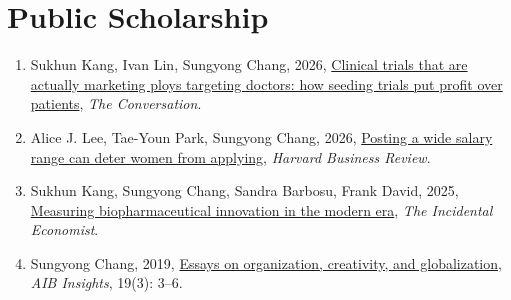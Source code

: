 \documentclass[11pt]{article}
\newenvironment{pubs}
  {\begin{enumerate}[label={(\arabic*)},leftmargin=1.9em,labelsep=0.5em,
     align=left,itemsep=5pt,topsep=3pt]}
  {\end{enumerate}}
\begin{document}
\section{Public Scholarship}
\begin{pubs}
\item Sukhun Kang, Ivan Lin, Sungyong Chang, 2026, \href{https://theconversation.com/clinical-trials-that-are-actually-marketing-ploys-targeting-doctors-how-seeding-trials-put-profit-over-patients-280398}{Clinical trials that are actually marketing ploys targeting doctors: how seeding trials put profit over patients}, \textit{The Conversation}.
\item Alice J. Lee, Tae-Youn Park, Sungyong Chang, 2026, \href{https://hbr.org/2026/02/posting-a-wide-salary-range-can-deter-women-from-applying}{Posting a wide salary range can deter women from applying}, \textit{Harvard Business Review}.
\item Sukhun Kang, Sungyong Chang, Sandra Barbosu, Frank David, 2025, \href{https://theincidentaleconomist.com/wordpress/measuring-biopharmaceutical-innovation-in-the-modern-era/}{Measuring biopharmaceutical innovation in the modern era}, \textit{The Incidental Economist}.
\item Sungyong Chang, 2019, \href{https://www.proquest.com/docview/2677072019/fulltextPDF/658EB1CAFEC14AB0PQ/1?accountid=10267&sourcetype=Scholarly\%20Journals}{Essays on organization, creativity, and globalization}, \textit{AIB Insights}, 19(3): 3--6.
\end{pubs}
\end{document}
